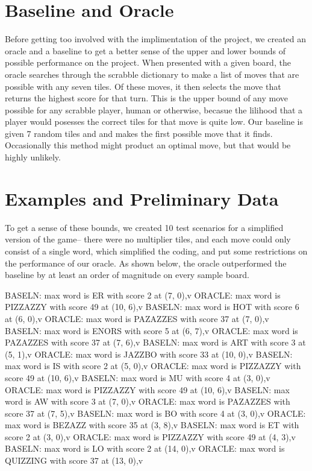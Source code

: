 \documentclass[12pt]{article}
\begin{document}
\section*{Baseline and Oracle}
	Before getting too involved with the implimentation of the project, we created an oracle and a baseline to get a better sense of the upper and lower bounds of possible performance on the project. When presented with a given board, the oracle searches through the scrabble dictionary to make a list of moves that are possible with any seven tiles. Of these moves, it then selects the move that returns the highest score for that turn. This is the upper bound of any move possible for any scrabble player, human or otherwise, becasue the lilihood that a player would posesses the correct tiles for that move is quite low. Our baseline is given 7 random tiles and and makes the first possible move that it finds. Occasionally this method might product an optimal move, but that would be highly unlikely.  

\section*{Examples and Preliminary Data}

To get a sense of these bounds, we created 10 test scenarios for a simplified version of the game-- there were no multiplier tiles, and each move could only consist of a single word, which simplified the coding, and put some restrictions on the performance of our oracle. As shown below, the oracle outperformed the baseline by at least an order of magnitude on every sample board. 

BASELN: max word is ER with score 2 at (7, 0),v
ORACLE: max word is PIZZAZZY with score 49 at (10, 6),v
BASELN: max word is HOT with score 6 at (6, 0),v
ORACLE: max word is PAZAZZES with score 37 at (7, 0),v
BASELN: max word is ENORS with score 5 at (6, 7),v
ORACLE: max word is PAZAZZES with score 37 at (7, 6),v
BASELN: max word is ART with score 3 at (5, 1),v
ORACLE: max word is JAZZBO with score 33 at (10, 0),v
BASELN: max word is IS with score 2 at (5, 0),v
ORACLE: max word is PIZZAZZY with score 49 at (10, 6),v
BASELN: max word is MU with score 4 at (3, 0),v
ORACLE: max word is PIZZAZZY with score 49 at (10, 6),v
BASELN: max word is AW with score 3 at (7, 0),v
ORACLE: max word is PAZAZZES with score 37 at (7, 5),v
BASELN: max word is BO with score 4 at (3, 0),v
ORACLE: max word is BEZAZZ with score 35 at (3, 8),v
BASELN: max word is ET with score 2 at (3, 0),v
ORACLE: max word is PIZZAZZY with score 49 at (4, 3),v
BASELN: max word is LO with score 2 at (14, 0),v
ORACLE: max word is QUIZZING with score 37 at (13, 0),v
\end{document}
